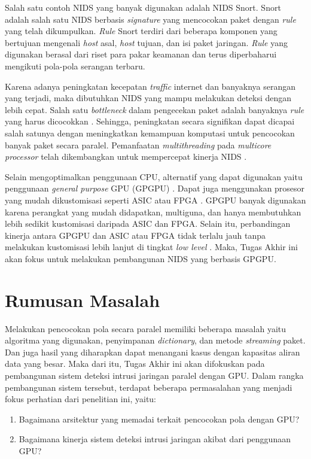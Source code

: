   Salah satu contoh NIDS yang banyak digunakan adalah NIDS Snort. Snort adalah salah satu NIDS berbasis \emph{signature} yang mencocokan paket dengan \emph{rule} yang telah dikumpulkan. \emph{Rule} Snort terdiri dari beberapa komponen yang bertujuan mengenali \emph{host} asal, \emph{host} tujuan, dan isi paket jaringan. \emph{Rule} yang digunakan berasal dari riset para pakar keamanan dan terus diperbaharui mengikuti pola-pola serangan terbaru.

  Karena adanya peningkatan kecepatan \emph{traffic} internet dan banyaknya serangan yang terjadi, maka dibutuhkan NIDS yang mampu melakukan deteksi dengan lebih cepat. Salah satu \emph{bottleneck} dalam pengecekan paket adalah banyaknya \emph{rule} yang harus dicocokkan \citep{pcre2007}. Sehingga, peningkatan secara signifikan dapat dicapai salah satunya dengan meningkatkan kemampuan komputasi untuk pencocokan banyak paket secara paralel. Pemanfaatan \emph{multithreading} pada \emph{multicore processor} telah dikembangkan untuk mempercepat kinerja NIDS \citep{multi2004}.

  Selain mengoptimalkan penggunaan CPU, alternatif yang dapat digunakan yaitu penggunaan \emph{general purpose} GPU (GPGPU) \citep{4482891}. Dapat juga menggunakan prosesor yang mudah dikustomisasi seperti ASIC atau FPGA \citep{fpga2008}. GPGPU banyak digunakan karena perangkat yang mudah didapatkan, multiguna, dan hanya membutuhkan lebih sedikit kustomisasi daripada ASIC dan FPGA. Selain itu, perbandingan kinerja antara GPGPU dan ASIC atau FPGA tidak terlalu jauh tanpa melakukan kustomisasi lebih lanjut di tingkat \emph{low level} \citep{gnort2008}. Maka, Tugas Akhir ini akan fokus untuk melakukan pembangunan NIDS yang berbasis GPGPU.

\section{Rumusan Masalah}

  Melakukan pencocokan pola secara paralel memiliki beberapa masalah yaitu algoritma yang digunakan, penyimpanan \emph{dictionary}, dan metode \emph{streaming} paket. Dan juga hasil yang diharapkan dapat menangani kasus dengan kapasitas aliran data yang besar. Maka dari itu, Tugas Akhir ini akan difokuskan pada pembangunan sistem deteksi intrusi jaringan paralel dengan GPU. Dalam rangka pembangunan sistem tersebut, terdapat beberapa permasalahan yang menjadi fokus perhatian dari penelitian ini, yaitu: 

  \begin{enumerate}
      \item Bagaimana arsitektur yang memadai terkait pencocokan pola dengan GPU?
      \item Bagaimana kinerja sistem deteksi intrusi jaringan akibat dari penggunaan GPU?
  \end{enumerate}

